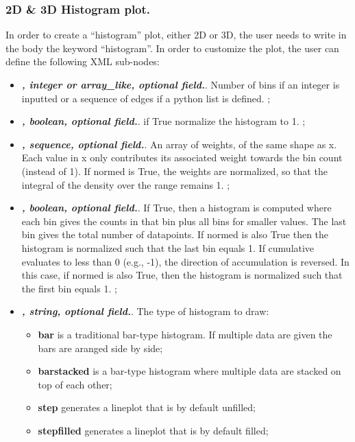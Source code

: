 \subsubsection{2D \& 3D Histogram plot.}
In order to create a ``histogram'' plot, either 2D or 3D, the user needs to
write in the  body the keyword ``histogram''.
%
In order to customize the plot, the user can define the following XML sub-nodes:
  \begin{itemize}
  \item {}\textbf{\textit{, integer or array\_like, optional field.}}.
  Number of bins if an integer is inputted or a sequence of edges if a python
  list is defined.
  ;
  \item {}\textbf{\textit{, boolean, optional field.}}.
  if True normalize the histogram to 1.
  ;
  \item {}\textbf{\textit{, sequence, optional field.}}.
  An array of weights, of the same shape as x.
  Each value in x only contributes its associated weight towards the bin count
  (instead of 1).
  If normed is True, the weights are normalized, so that the integral of the
  density over the range remains 1.
  ;
  \item {}\textbf{\textit{, boolean, optional field.}}.
  If True, then a histogram is computed where each bin gives the counts in that
  bin plus all bins for smaller values.
  The last bin gives the total number of datapoints.
  If normed is also True then the histogram is normalized such that the last bin
  equals 1.
  If cumulative evaluates to less than 0 (e.g., -1), the direction of
  accumulation is reversed.
  In this case, if normed is also True, then the histogram is normalized such
  that the first bin equals 1.
   ;
  \item {}\textbf{\textit{, string, optional field.}}.
  The type of histogram to draw:
         \begin{itemize}
    \item \textbf{bar} is a traditional bar-type histogram.
    If multiple data are given the bars are aranged side by side;
    \item \textbf{barstacked} is a bar-type histogram where multiple data are
    stacked on top of each other;
    \item \textbf{step} generates a lineplot that is by default unfilled;
    \item \textbf{stepfilled} generates a lineplot that is by default filled;

\end{itemize}
\end{itemize}
